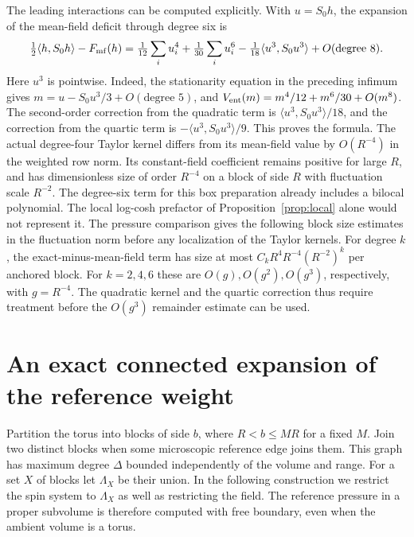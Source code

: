\documentclass[11pt]{article}
\begin{document}
The leading interactions can be computed explicitly. With \(u=S_0h\),
the expansion of the mean-field deficit through degree six is
\begin{equation}\label{eq:entsextic}
 \tfrac12\langle h,S_0h\rangle-F_{\rm mf}(h)
  =\tfrac1{12}\sum_i u_i^4+\tfrac1{30}\sum_i u_i^6
          -\tfrac1{18}\langle u^3,S_0u^3\rangle
          +O(\text{degree }8).
\end{equation}
Here \(u^3\) is pointwise. Indeed, the stationarity equation in the
preceding infimum gives \(m=u-S_0u^3/3+O(\text{degree }5)\), and
\(V_{\rm ent}(m)=m^4/12+m^6/30+O(m^8)\). The second-order correction
from the quadratic term is \(\langle u^3,S_0u^3\rangle/18\), and
the correction from the quartic term is
\(-\langle u^3,S_0u^3\rangle/9\). This proves the formula.
The actual degree-four Taylor kernel differs from its mean-field
value by \(O(R^{-4})\) in the weighted row norm. Its constant-field
coefficient remains positive for large \(R\), and has dimensionless
size of order \(R^{-4}\) on a block of side \(R\) with fluctuation
scale \(R^{-2}\). The degree-six term for this box preparation
already includes a bilocal polynomial. The local log-cosh prefactor
of Proposition~\ref{prop:local} alone would not represent it. The
pressure comparison gives the following block size estimates in
the fluctuation norm before any localization of the Taylor kernels.
For degree \(k\), the exact-minus-mean-field term has size at most
\(C_k R^4R^{-4}(R^{-2})^k\) per anchored block. For \(k=2,4,6\)
these are \(O(g),O(g^2),O(g^3)\), respectively, with
\(g=R^{-4}\). The quadratic kernel and the quartic correction thus
require treatment before the \(O(g^3)\) remainder estimate can be used.

\section{An exact connected expansion of the reference weight}

Partition the torus into blocks of side \(b\), where \(R<b\le M R\)
for a fixed \(M\). Join two distinct blocks when some microscopic
reference edge joins them. This graph has maximum degree \(\Delta\)
bounded independently of the volume and range. For a set \(X\) of
blocks let \(\Lambda_X\) be their union. In the following construction
we restrict the spin system to \(\Lambda_X\) as well as restricting
the field. The reference pressure in a proper subvolume is therefore
computed with free boundary, even when the ambient volume is a torus.
\end{document}

